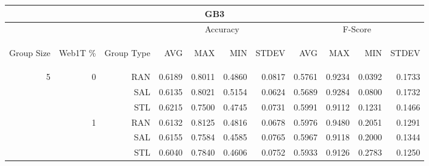 \begin{center}
\begin{table}[htbp] 
 \begin{center}
\begin{tabular}{ | r | r | r | r | r | r | r | r | r | r | r |}
\hline
\multicolumn{11}{|c|}{GB3}\\
\hline
 & & & \multicolumn{4}{|c|}{Accuracy} & \multicolumn{4}{|c|}{F-Score}\\ \cline{4-11}
\begin{sideways}Group Size\end{sideways} & \begin{sideways}Web1T \%\end{sideways} & \begin{sideways}Group Type\end{sideways} & \begin{sideways}AVG\end{sideways} & \begin{sideways}MAX\end{sideways} & \begin{sideways}MIN\end{sideways} & \begin{sideways}STDEV\end{sideways} & \begin{sideways}AVG\end{sideways} & \begin{sideways}MAX\end{sideways} & \begin{sideways}MIN\end{sideways} & \begin{sideways}STDEV\end{sideways}\\
\hline
\multirow{18}{*}{5}
 & \multirow{3}{*}{0} & RAN & 0.6189 & 0.8011 & 0.4860 & 0.0817 & 0.5761 & 0.9234 & 0.0392 & 0.1733\\ \cline{3-11}
 &   & SAL & 0.6135 & 0.8021 & 0.5154 & 0.0624 & 0.5689 & 0.9284 & 0.0800 & 0.1732\\ \cline{3-11}
 &   & STL & 0.6215 & 0.7500 & 0.4745 & 0.0731 & 0.5991 & 0.9112 & 0.1231 & 0.1466\\ \cline{2-11}
 & \multirow{3}{*}{1} & RAN & 0.6132 & 0.8125 & 0.4816 & 0.0678 & 0.5976 & 0.9480 & 0.2051 & 0.1291\\ \cline{3-11}
 &   & SAL & 0.6155 & 0.7584 & 0.4585 & 0.0765 & 0.5967 & 0.9118 & 0.2000 & 0.1344\\ \cline{3-11}
 &   & STL & 0.6040 & 0.7840 & 0.4606 & 0.0752 & 0.5933 & 0.9126 & 0.2783 & 0.1250\\ \cline{2-11}

\end{tabular}
\end{center}
\end{table}
\end{center}
